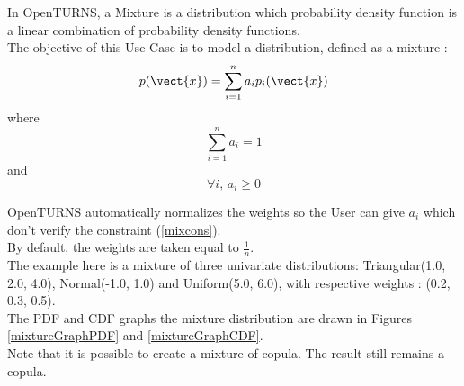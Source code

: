 \renewcommand{\filename}{docUC_InputNoData_Mixture.tex}
\renewcommand{\filetitle}{UC : Creation  of a nD distribution from a Mixture}

\HeaderIIILevel

\label{Mixture}


In OpenTURNS, a Mixture is a distribution which probability density function is a linear combination of probability density functions.\\

The objective of this Use Case is to model a distribution, defined as a mixture :
\begin {equation}\label{mixPDF}
  p(\vect{x}) = \sum_{i=1}^{n} a_i p_i(\vect{x})
\end{equation}
where
\begin {equation}\label{mixcons}
  \sum_{i=1}^{n} a_i = 1
\end{equation}
and
\begin {equation}\label{mixcons2}
  \forall i,  \, a_i \geq 0
\end{equation}

OpenTURNS automatically normalizes the  weights so the User can give $a_i$ which don't verify the constraint (\ref{mixcons}). \\
By default, the weights are taken equal to $\frac{1}{n}$.\\

The example here is a mixture of three univariate distributions: Triangular(1.0, 2.0, 4.0), Normal(-1.0, 1.0) and Uniform(5.0, 6.0), with respective weights : (0.2, 0.3, 0.5).\\
The PDF and CDF graphs the mixture distribution are drawn in Figures \ref{mixtureGraphPDF} and  \ref{mixtureGraphCDF}.\\

Note that it is possible to create a mixture of copula. The result still remains a copula.

